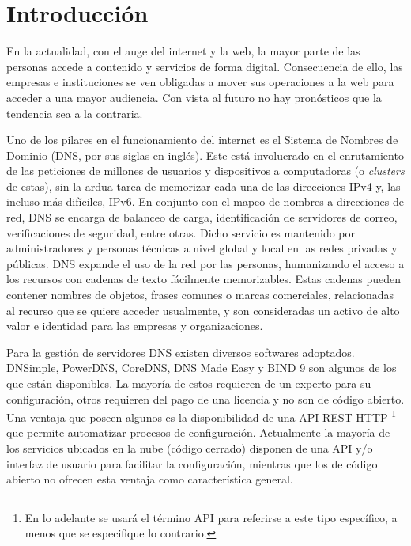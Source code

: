 \chapter{Introducción}\label{chapter:introduction}

En la actualidad, con el auge del internet y la web, la mayor parte de las personas accede a contenido y servicios de forma digital. Consecuencia de ello, las empresas e instituciones se ven obligadas a mover sus operaciones a la web para acceder a una mayor audiencia. Con vista al futuro no hay pronósticos que la tendencia sea a la contraria.

Uno de los pilares en el funcionamiento del internet es el Sistema de Nombres de Dominio (DNS, por sus siglas en inglés). Este está involucrado en el enrutamiento de las peticiones de millones de usuarios y dispositivos a computadoras (o \textit{clusters} de estas), sin la ardua tarea de memorizar cada una de las direcciones IPv4 y, las incluso más difíciles, IPv6. En conjunto con el mapeo de nombres a direcciones de red, DNS se encarga de balanceo de carga, identificación de servidores de correo, verificaciones de seguridad, entre otras. Dicho servicio es mantenido por administradores y personas técnicas a nivel global y local en las redes privadas y públicas. DNS expande el uso de la red por las personas, humanizando el acceso a los recursos con cadenas de texto fácilmente memorizables. Estas cadenas pueden contener nombres de objetos, frases comunes o marcas comerciales, relacionadas al recurso que se quiere acceder usualmente, y son consideradas un activo de alto valor e identidad para las empresas y organizaciones.

Para la gestión de servidores DNS existen diversos softwares adoptados. DNSimple, PowerDNS, CoreDNS, DNS Made Easy y BIND 9 son algunos de los que están disponibles. La mayoría de estos requieren de un experto para su configuración, otros requieren del pago de una licencia y no son de código abierto. Una ventaja que poseen algunos es la disponibilidad de una API REST HTTP \footnote{En lo adelante se usará el término API para referirse a este tipo específico, a menos que se especifique lo contrario.} que permite automatizar procesos de configuración. Actualmente la mayoría de los servicios ubicados en la nube (código cerrado) disponen de una API y/o interfaz de usuario para facilitar la configuración, mientras que los de código abierto no ofrecen esta ventaja como característica general.

